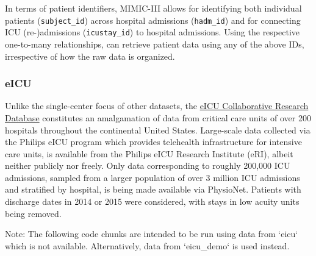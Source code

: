 \documentclass[
  notitle]{jss}
\begin{document}
In terms of patient identifiers, MIMIC-III allows for identifying both
individual patients (\texttt{subject\_id}) across hospital admissions
(\texttt{hadm\_id}) and for connecting ICU (re-)admissions
(\texttt{icustay\_id}) to hospital admissions. Using the respective
one-to-many relationships,  can retrieve patient data using
any of the above IDs, irrespective of how the raw data is organized.

\hypertarget{eicu}{%
\subsubsection{eICU}\label{eicu}}

Unlike the single-center focus of other datasets, the
\href{https://physionet.org/content/eicu-crd/2.0/}{eICU Collaborative
Research Database} constitutes an amalgamation of data from critical
care units of over 200 hospitals throughout the continental United
States. Large-scale data collected via the Philips eICU program which
provides telehealth infrastructure for intensive care units, is
available from the Philips eICU Research Institute (eRI), albeit neither
publicly nor freely. Only data corresponding to roughly 200,000 ICU
admissions, sampled from a larger population of over 3 million ICU
admissions and stratified by hospital, is being made available via
PhysioNet. Patients with discharge dates in 2014 or 2015 were
considered, with stays in low acuity units being removed.

\begin{CodeChunk}
\begin{CodeOutput}
Note: The following code chunks are intended to be run using data from
`eicu` which is not available. Alternatively, data from `eicu_demo` is
used instead.
\end{CodeOutput}
\end{CodeChunk}
\end{document}
